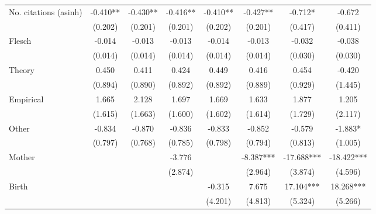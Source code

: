 \begin{table}
\begin{adjustwidth}{-0.085cm}{}
\begin{threeparttable}
\begin{tabular}{p{2.64cm}SSSSSSS}
            No. citations (asinh)         &      -0.410** &      -0.430** &      -0.416** &      -0.410** &      -0.427** &      -0.712*  &      -0.672   \\
                                          &     (0.202)   &     (0.201)   &     (0.201)   &     (0.202)   &     (0.201)   &     (0.417)   &     (0.411)   \\
            Flesch                        &      -0.014   &      -0.013   &      -0.013   &      -0.014   &      -0.013   &      -0.032   &      -0.038   \\
                                          &     (0.014)   &     (0.014)   &     (0.014)   &     (0.014)   &     (0.014)   &     (0.030)   &     (0.030)   \\
            Theory                        &       0.450   &       0.411   &       0.424   &       0.449   &       0.416   &       0.454   &      -0.420   \\
                                          &     (0.894)   &     (0.890)   &     (0.892)   &     (0.892)   &     (0.889)   &     (0.929)   &     (1.445)   \\
            Empirical                     &       1.665   &       2.128   &       1.697   &       1.669   &       1.633   &       1.877   &       1.205   \\
                                          &     (1.615)   &     (1.663)   &     (1.600)   &     (1.602)   &     (1.614)   &     (1.729)   &     (2.117)   \\
            Other                         &      -0.834   &      -0.870   &      -0.836   &      -0.833   &      -0.852   &      -0.579   &      -1.883*  \\
                                          &     (0.797)   &     (0.768)   &     (0.785)   &     (0.798)   &     (0.794)   &     (0.813)   &     (1.005)   \\
            Mother                        &               &               &      -3.776   &               &      -8.387***&     -17.688***&     -18.422***\\
                                          &               &               &     (2.874)   &               &     (2.964)   &     (3.874)   &     (4.596)   \\
            Birth                         &               &               &               &      -0.315   &       7.675   &      17.104***&      18.268***\\
                                          &               &               &               &     (4.201)   &     (4.813)   &     (5.324)   &     (5.266)   \\

\end{tabular}
\end{threeparttable}
\end{adjustwidth}
\end{table}
